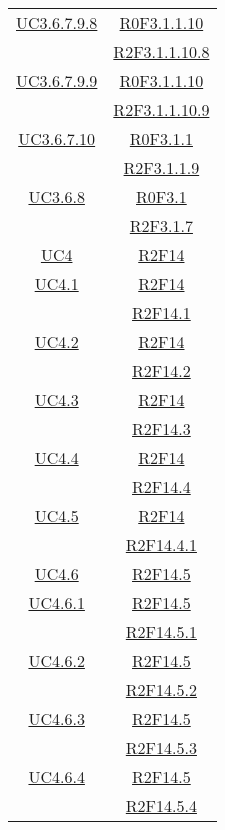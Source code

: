 \begin{longtable}{|c|c|}
\hline
\hyperlink{UC3.6.7.9.8}{UC3.6.7.9.8} & \hyperlink{R0F3.1.1.10}{R0F3.1.1.10}\\
& \hyperlink{R2F3.1.1.10.8}{R2F3.1.1.10.8}\\
\hline
\hyperlink{UC3.6.7.9.9}{UC3.6.7.9.9} & \hyperlink{R0F3.1.1.10}{R0F3.1.1.10}\\
& \hyperlink{R2F3.1.1.10.9}{R2F3.1.1.10.9}\\
\hline
\hyperlink{UC3.6.7.10}{UC3.6.7.10} & \hyperlink{R0F3.1.1}{R0F3.1.1}\\
& \hyperlink{R2F3.1.1.9}{R2F3.1.1.9}\\
\hline
\hyperlink{UC3.6.8}{UC3.6.8} & \hyperlink{R0F3.1}{R0F3.1}\\
& \hyperlink{R2F3.1.7}{R2F3.1.7}\\
\hline
\hyperlink{UC4}{UC4} & \hyperlink{R2F14}{R2F14}\\
\hline
\hyperlink{UC4.1}{UC4.1} & \hyperlink{R2F14}{R2F14}\\
& \hyperlink{R2F14.1}{R2F14.1}\\
\hline
\hyperlink{UC4.2}{UC4.2} & \hyperlink{R2F14}{R2F14}\\
& \hyperlink{R2F14.2}{R2F14.2}\\
\hline
\hyperlink{UC4.3}{UC4.3} & \hyperlink{R2F14}{R2F14}\\
& \hyperlink{R2F14.3}{R2F14.3}\\
\hline
\hyperlink{UC4.4}{UC4.4} & \hyperlink{R2F14}{R2F14}\\
& \hyperlink{R2F14.4}{R2F14.4}\\
\hline
\hyperlink{UC4.5}{UC4.5} & \hyperlink{R2F14}{R2F14}\\
& \hyperlink{R2F14.4.1}{R2F14.4.1}\\
\hline
\hyperlink{UC4.6}{UC4.6} & \hyperlink{R2F14.5}{R2F14.5}\\
\hline
\hyperlink{UC4.6.1}{UC4.6.1} & \hyperlink{R2F14.5}{R2F14.5}\\
& \hyperlink{R2F14.5.1}{R2F14.5.1}\\
\hline
\hyperlink{UC4.6.2}{UC4.6.2} & \hyperlink{R2F14.5}{R2F14.5}\\
& \hyperlink{R2F14.5.2}{R2F14.5.2}\\
\hline
\hyperlink{UC4.6.3}{UC4.6.3} & \hyperlink{R2F14.5}{R2F14.5}\\
& \hyperlink{R2F14.5.3}{R2F14.5.3}\\
\hline
\hyperlink{UC4.6.4}{UC4.6.4} & \hyperlink{R2F14.5}{R2F14.5}\\
& \hyperlink{R2F14.5.4}{R2F14.5.4}\\

\end{longtable}
